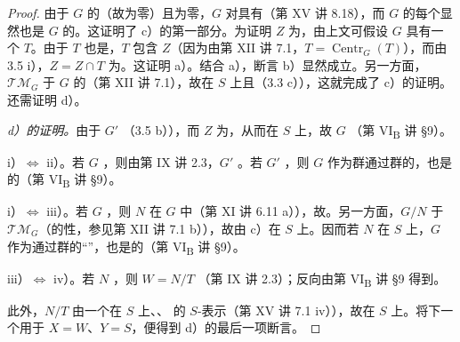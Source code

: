 \begin{proof}
由于 $G$ 的（故为零）且为零，$G$ 对具有（第 XV 讲 8.18），而 $G$ 的每个显然也是 $G$ 的。这证明了 c）的第一部分。为证明 $Z$ 为，由上文可假设 $G$ 具有一个 $T$。由于 $T$ 也是，$T$ 包含 $Z$（因为由第 XII 讲 7.1，$T=\operatorname{Centr}_G(T)$），而由 3.5 i），$Z=Z\cap T$ 为。这证明 a）。结合 a），断言 b）显然成立。另一方面， $\mathscr{TM}_G$ 于 $G$ 的（第 XII 讲 7.1），故在 $S$ 上且（3.3 c）），这就完成了 c）的证明。还需证明 d）。

\emph{d）的证明。}由于 $G'$ （3.5 b）），而 $Z$ 为，从而在 $S$ 上，故 $G$ （第 VI\textsubscript{B} 讲 §9）。

 i）$\Leftrightarrow$ ii）。若 $G$ ，则由第 IX 讲 2.3，$G'$ 。若 $G'$ ，则 $G$ 作为群通过群的，也是的（第 VI\textsubscript{B} 讲 §9）。

 i）$\Leftrightarrow$ iii）。若 $G$ ，则 $N$ 在 $G$ 中（第 XI 讲 6.11 a）），故。另一方面，$G/N$ 于 $\mathscr{TM}_G$（的性，参见第 XII 讲 7.1 b）），故由 c）在 $S$ 上。因而若 $N$ 在 $S$ 上，$G$ 作为通过群的“”，也是的（第 VI\textsubscript{B} 讲 §9）。

 iii）$\Leftrightarrow$ iv）。若 $N$ ，则 $W=N/T$ （第 IX 讲 2.3）；反向由第 VI\textsubscript{B} 讲 §9 得到。

此外，$N/T$ 由一个在 $S$ 上、、
的 $S$-表示（第 XV 讲 7.1 iv）），故在 $S$ 上。将下一个用于 $X=W$、$Y=S$，便得到 d）的最后一项断言。
\end{proof}
